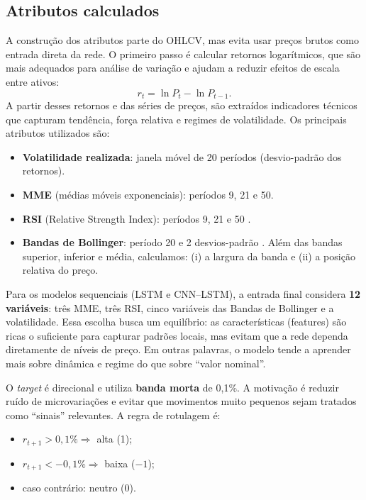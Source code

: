 \subsection{Atributos calculados}
A construção dos atributos parte do OHLCV, mas evita usar preços brutos como entrada direta da rede.
O primeiro passo é calcular retornos logarítmicos, que são mais adequados para análise de variação
e ajudam a reduzir efeitos de escala entre ativos:
\[
r_t = \ln P_t - \ln P_{t-1}.
\]
A partir desses retornos e das séries de preços, são extraídos indicadores técnicos
que capturam tendência, força relativa e regimes de volatilidade.
Os principais atributos utilizados são:

\begin{itemize}
  \item \textbf{Volatilidade realizada}: janela móvel de 20 períodos (desvio-padrão dos retornos).
  \item \textbf{MME} (médias móveis exponenciais): períodos 9, 21 e 50.
  \item \textbf{RSI} (Relative Strength Index): períodos 9, 21 e 50 \cite{Murphy1999}.
  \item \textbf{Bandas de Bollinger}: período 20 e 2 desvios-padrão \cite{Bollinger2001}.
        Além das bandas superior, inferior e média, calculamos:
        (i) a largura da banda e (ii) a posição relativa do preço.
\end{itemize}

Para os modelos sequenciais (LSTM e CNN--LSTM), a entrada final considera \textbf{12 variáveis}:
três MME, três RSI, cinco variáveis das Bandas de Bollinger e a volatilidade.
Essa escolha busca um equilíbrio: as características (features) são ricas o suficiente para capturar padrões locais,
mas evitam que a rede dependa diretamente de níveis de preço.
Em outras palavras, o modelo tende a aprender mais sobre dinâmica e regime do que sobre “valor nominal”.

O \emph{target} é direcional e utiliza \textbf{banda morta} de 0,1\%.
A motivação é reduzir ruído de microvariações e evitar que movimentos muito pequenos sejam tratados
como “sinais” relevantes.
A regra de rotulagem é:

\begin{itemize}
  \item $r_{t+1} > 0{,}1\% \Rightarrow$ alta (1);
  \item $r_{t+1} < -0{,}1\% \Rightarrow$ baixa ($-1$);
  \item caso contrário: neutro (0).
\end{itemize}

